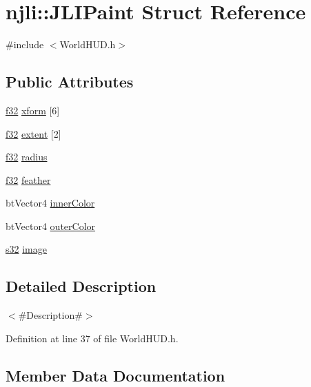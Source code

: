 \hypertarget{structnjli_1_1_j_l_i_paint}{}\section{njli\+:\+:J\+L\+I\+Paint Struct Reference}
\label{structnjli_1_1_j_l_i_paint}


{\ttfamily \#include $<$World\+H\+U\+D.\+h$>$}

\subsection*{Public Attributes}
\begin{DoxyCompactItemize}
\item 
\mbox{\hyperlink{_util_8h_a5f6906312a689f27d70e9d086649d3fd}{f32}} \mbox{\hyperlink{structnjli_1_1_j_l_i_paint_ace4bc2627435f8b885026d397371bab0}{xform}} \mbox{[}6\mbox{]}
\item 
\mbox{\hyperlink{_util_8h_a5f6906312a689f27d70e9d086649d3fd}{f32}} \mbox{\hyperlink{structnjli_1_1_j_l_i_paint_a83e7cb273d83a5cba38622cf389a6279}{extent}} \mbox{[}2\mbox{]}
\item 
\mbox{\hyperlink{_util_8h_a5f6906312a689f27d70e9d086649d3fd}{f32}} \mbox{\hyperlink{structnjli_1_1_j_l_i_paint_a7496627a07e930c0f224b7bdab820924}{radius}}
\item 
\mbox{\hyperlink{_util_8h_a5f6906312a689f27d70e9d086649d3fd}{f32}} \mbox{\hyperlink{structnjli_1_1_j_l_i_paint_a0ca1781af3e96711b8d93398942a83d1}{feather}}
\item 
bt\+Vector4 \mbox{\hyperlink{structnjli_1_1_j_l_i_paint_a1d498a43bc3248a1ac16e5b5b1627a6a}{inner\+Color}}
\item 
bt\+Vector4 \mbox{\hyperlink{structnjli_1_1_j_l_i_paint_a1503a9e8b210e51f305939d54eb57e3f}{outer\+Color}}
\item 
\mbox{\hyperlink{_util_8h_aa62c75d314a0d1f37f79c4b73b2292e2}{s32}} \mbox{\hyperlink{structnjli_1_1_j_l_i_paint_a3f6e3a4e448803312e7506cf45b31e3f}{image}}
\end{DoxyCompactItemize}


\subsection{Detailed Description}
$<$\#\+Description\#$>$ 

Definition at line 37 of file World\+H\+U\+D.\+h.



\subsection{Member Data Documentation}
\mbox{\label{structnjli_1_1_j_l_i_paint_a83e7cb273d83a5cba38622cf389a6279}} 
